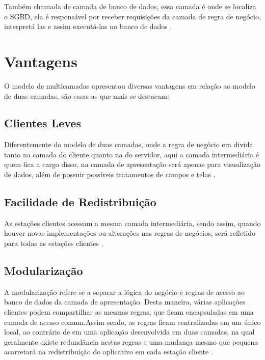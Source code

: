 Também chamada de camada de banco de dados, essa camada é onde se localiza o \ac{SGBD}, ela é responsável por receber requisições da camada de regra de negócio, interpretá las e assim executá-las no banco de dados  \cite{devmediaMultiCamada2018}.


\section{Vantagens}

O modelo de multicamadas apresentou diversas vantagens em relação ao modelo de duas camadas, são essas as que mais se destacam:

\subsection{Clientes Leves}

Diferentemente do modelo de duas camadas, onde a regra de negócio era divida tanto na camada do cliente quanto na do servidor, aqui a camada intermediária é quem fica a cargo disso, na camada de apresentação será apenas para visualização de dados, além de possuir possíveis tratamentos de campos e telas  \cite{devmediaMultiCamada2018}.

\subsection{Facilidade de Redistribuição}

As estações clientes acessam a mesma camada intermediária, sendo assim, quando houver novas implementações ou alterações nas regras de negócios, será refletido para todas as estações clientes  \cite{devmediaMultiCamada2018}.

\subsection{Modularização}

A modularização refere-se a separar a lógica do negócio e regras de acesso ao banco de dados da camada de apresentação. Desta maneira, várias aplicações clientes podem compartilhar as mesmas regras, que ficam encapsuladas em uma camada de acesso comum.Assim sendo, as regras ficam centralizadas em um único local, ao contrário de em uma aplicação desenvolvida em duas camadas, na qual geralmente existe redundância nestas regras e uma mudança mesmo que pequena acarretará na redistribuição do aplicativo em cada estação cliente \cite{devmediaMultiCamada2018}.

